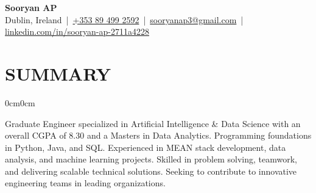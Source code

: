 \documentclass[10pt, letterpaper]{article}
\newenvironment{onecolentry}{
    \begin{adjustwidth}{0cm}{0cm}
}{
    \end{adjustwidth}
}
\begin{document}
\begin{center}
    {\fontsize{26}{28}\selectfont \textbf{Sooryan AP}}\\[6pt]
    \normalsize
    Dublin, Ireland \,|\,
    \href{tel:+353894992592}{+353 89 499 2592} \,|\,
    \href{mailto:sooryanap3@gmail.com}{sooryanap3@gmail.com} \,|\,
    \href{https://linkedin.com/in/sooryan-ap-2711a4228}{linkedin.com/in/sooryan-ap-2711a4228}
\end{center}

    \vspace{0.4cm}

    \section{SUMMARY}
    \begin{onecolentry}
    Graduate Engineer specialized in Artificial Intelligence \& Data Science with an overall CGPA of 8.30 and a Masters in Data Analytics. Programming foundations in Python, Java, and SQL. Experienced in MEAN stack development, data analysis, and machine learning projects. Skilled in problem solving, teamwork, and delivering scalable technical solutions. Seeking to contribute to innovative engineering teams in leading organizations.
    \end{onecolentry}

    \vspace{0.2cm}

\end{document}
